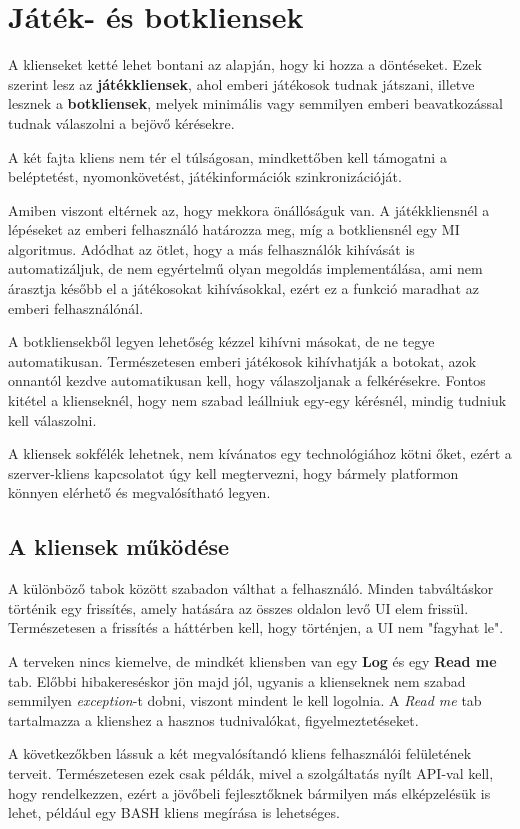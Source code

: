 \documentclass[twoside, a4paper, 12pt]{book}
\begin{document}
\section{Játék- és botkliensek}
A klienseket ketté lehet bontani az alapján, hogy ki hozza a döntéseket. Ezek szerint lesz az \textbf{játékkliensek}, ahol emberi játékosok tudnak játszani, illetve lesznek a \textbf{botkliensek}, melyek minimális vagy semmilyen emberi beavatkozással tudnak válaszolni a bejövő kérésekre.

A két fajta kliens nem tér el túlságosan, mindkettőben kell támogatni a beléptetést, nyomonkövetést, játékinformációk szinkronizációját.

Amiben viszont eltérnek az, hogy mekkora önállóságuk van. A játékkliensnél a lépéseket az emberi felhasználó határozza meg, míg a botkliensnél egy MI algoritmus. Adódhat az ötlet, hogy a más felhasználók kihívását is automatizáljuk, de nem egyértelmű olyan megoldás implementálása, ami nem árasztja később el a játékosokat kihívásokkal, ezért ez a funkció maradhat az emberi felhasználónál.

A botkliensekből legyen lehetőség kézzel kihívni másokat, de ne tegye automatikusan. Természetesen emberi játékosok kihívhatják a botokat, azok onnantól kezdve automatikusan kell, hogy válaszoljanak a felkérésekre.
Fontos kitétel a klienseknél, hogy nem szabad leállniuk egy-egy kérésnél, mindig tudniuk kell válaszolni.

A kliensek sokfélék lehetnek, nem kívánatos egy technológiához kötni őket, ezért a szerver-kliens kapcsolatot úgy kell megtervezni, hogy bármely platformon könnyen elérhető és megvalósítható legyen.

\subsection{A kliensek működése}
A különböző tabok között szabadon válthat a felhasználó. Minden tabváltáskor történik egy frissítés, amely hatására az összes oldalon levő UI elem frissül. Természetesen a frissítés a háttérben kell, hogy történjen, a UI nem "fagyhat le".

A terveken nincs kiemelve, de mindkét kliensben van egy \textbf{Log} és egy \textbf{Read me} tab. Előbbi hibakereséskor jön majd jól, ugyanis a klienseknek nem szabad semmilyen \textit{exception}-t dobni, viszont mindent le kell logolnia. A \textit{Read me} tab tartalmazza a klienshez a hasznos tudnivalókat, figyelmeztetéseket.

A következőkben lássuk a két megvalósítandó kliens felhasználói felületének terveit. Természetesen ezek csak példák, mivel a szolgáltatás nyílt API-val kell, hogy rendelkezzen, ezért a jövőbeli fejlesztőknek bármilyen más elképzelésük is lehet, például egy BASH kliens megírása is lehetséges.
\end{document}

